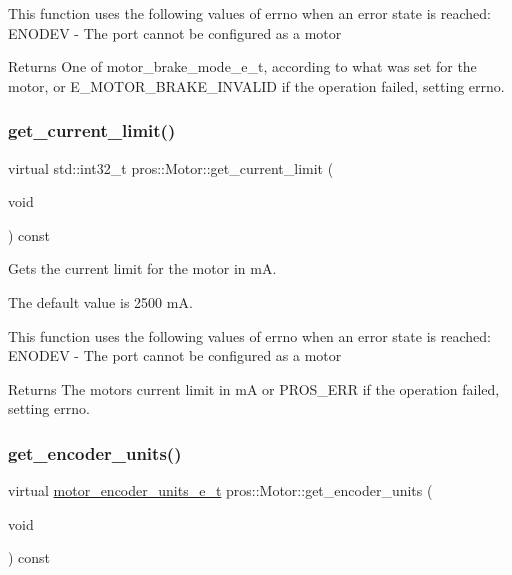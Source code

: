 This function uses the following values of errno when an error state is reached\+: E\+N\+O\+D\+EV -\/ The port cannot be configured as a motor

\begin{DoxyReturn}{Returns}
One of motor\+\_\+brake\+\_\+mode\+\_\+e\+\_\+t, according to what was set for the motor, or E\+\_\+\+M\+O\+T\+O\+R\+\_\+\+B\+R\+A\+K\+E\+\_\+\+I\+N\+V\+A\+L\+ID if the operation failed, setting errno. 
\end{DoxyReturn}
\mbox{\label{classpros_1_1Motor_ad2eafcdf16ed480ddcbb80a45b19c01a}} 
\subsubsection{\texorpdfstring{get\+\_\+current\+\_\+limit()}{get\_current\_limit()}}
{\footnotesize\ttfamily virtual std\+::int32\+\_\+t pros\+::\+Motor\+::get\+\_\+current\+\_\+limit (\begin{DoxyParamCaption}\item[{void}]{ }\end{DoxyParamCaption}) const\hspace{0.3cm}{\ttfamily [virtual]}}



Gets the current limit for the motor in mA. 

The default value is 2500 mA.

This function uses the following values of errno when an error state is reached\+: E\+N\+O\+D\+EV -\/ The port cannot be configured as a motor

\begin{DoxyReturn}{Returns}
The motor\textquotesingle{}s current limit in mA or P\+R\+O\+S\+\_\+\+E\+RR if the operation failed, setting errno. 
\end{DoxyReturn}
\mbox{\label{classpros_1_1Motor_a9fd37f3efa2f903bda8bf575b0052fd2}} 
\subsubsection{\texorpdfstring{get\+\_\+encoder\+\_\+units()}{get\_encoder\_units()}}
{\footnotesize\ttfamily virtual \hyperlink{motors_8h_a6677ba23760c558fd8b7b4e1e00a6123}{motor\+\_\+encoder\+\_\+units\+\_\+e\+\_\+t} pros\+::\+Motor\+::get\+\_\+encoder\+\_\+units (\begin{DoxyParamCaption}\item[{void}]{ }\end{DoxyParamCaption}) const\hspace{0.3cm}{\ttfamily [virtual]}}



